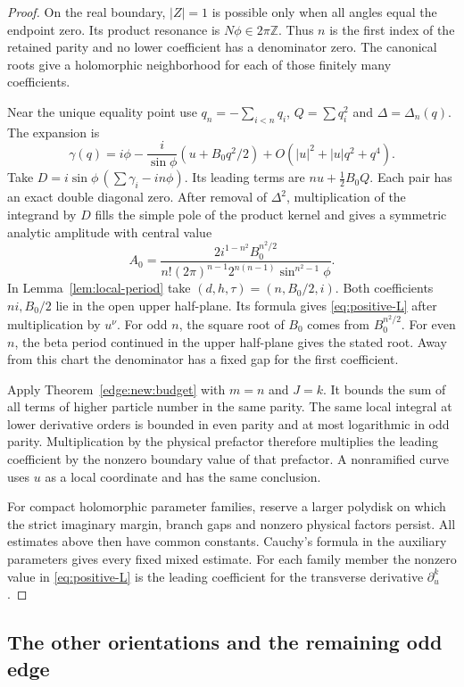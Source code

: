 \documentclass[11pt]{article}
\numberwithin{equation}{section}
\theoremstyle{definition}
\newcommand{\Z}{\mathbb Z}
\begin{document}
\begin{proof}
On the real boundary, $|Z|=1$ is possible only when all angles
equal the endpoint zero. Its product resonance is $N\phi\in2\pi\Z$.
Thus $n$ is the first index of the retained parity and no lower
coefficient has a denominator zero. The canonical roots give a
holomorphic neighborhood for each of those finitely many coefficients.

Near the unique equality point use $q_n=-\sum_{i<n}q_i$,
$Q=\sum q_i^2$ and $\Delta=\Delta_n(q)$. The expansion is
\[
 \gamma(q)=i\phi-\frac{i}{\sin\phi}
              (u+B_0q^2/2)+O(|u|^2+|u|q^2+q^4).
\]
Take $D=i\sin\phi\,(\sum\gamma_i-in\phi)$. Its leading terms are
$n u+\tfrac12 B_0 Q$. Each pair has an exact double diagonal zero.
After removal of $\Delta^2$, multiplication
of the integrand by $D$ fills the simple pole of the product kernel
and gives a symmetric analytic amplitude with central value
\[
 A_0=\frac{2i^{1-n^2} B_0^{n^2/2}}
 {n!(2\pi)^{n-1}2^{n(n-1)}\sin^{n^2-1}\phi}.
\]
In Lemma~\ref{lem:local-period} take $(d,h,\tau)=(n,B_0/2,i)$.
Both coefficients $ni,B_0/2$ lie in the open upper half-plane.
Its formula gives \eqref{eq:positive-L} after multiplication by
$u^\nu$. For odd $n$, the square root of $B_0$ comes from
$B_0^{n^2/2}$. For even $n$, the beta period continued in the upper
half-plane gives the stated root. Away from this chart the denominator
has a fixed gap for the first coefficient.

Apply Theorem~\ref{edge:new:budget} with $m=n$ and $J=k$.
It bounds the sum of all terms of higher particle number in the same parity.
The same local integral at lower derivative orders is bounded
in even parity and at most logarithmic in odd parity. Multiplication
by the physical prefactor therefore multiplies the leading coefficient
by the nonzero boundary value of that prefactor. A nonramified curve
uses $u$ as a local coordinate and has the same conclusion.

For compact holomorphic parameter families, reserve a larger polydisk
on which the
strict imaginary margin, branch gaps and nonzero physical factors
persist. All estimates above then have common constants. Cauchy's
formula in the auxiliary parameters gives every fixed mixed estimate.
For each family member the nonzero value in \eqref{eq:positive-L}
is the leading coefficient for the transverse derivative $\partial_u^k$.
\end{proof}

\subsection{The other orientations and the remaining odd edge}
\end{document}

